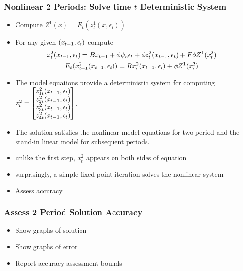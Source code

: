 \documentclass[letter]{beamer}
\begin{document}
\begin{frame}
  \frametitle{Nonlinear 2 Periods: Solve time $t$ Deterministic
    System }
{\small
  \begin{itemize}
  \item Compute $Z^1(x)= E_t(z^1_t(x,\epsilon_t))$
  \item For any given $(x_{t-1},\epsilon_t)$ 
compute
{\small
  \begin{gather}
    x_t^2(x_{t-1},\epsilon_t)=B x_{t-1} + \phi \psi_e\epsilon_t + \phi z^2_t(x_{t-1},\epsilon_t) + F \phi Z^1(x^2_t) \label{bothS}\\
    E_t(x^2_{t+1}(x_{t-1},\epsilon_t))=B x^2_{t}(x_{t-1},\epsilon_t)+ \phi Z^1(x^2_t)
  \end{gather}
}
\item The model equations provide a deterministic system  for computing $  z^2_t=\begin{bmatrix}
    z^2_{1t}(x_{t-1},\epsilon_t)\\
    z^2_{2t}(x_{t-1},\epsilon_t)\\
    z^2_{3t}(x_{t-1},\epsilon_t)\\
    z^2_{4t}(x_{t-1},\epsilon_t)
  \end{bmatrix}$.
\item The solution satisfies the nonlinear model equations for two 
period and the stand-in linear model for subsequent periods.
\item unlike the first step, $x^2_t$ appears on both sides of equation 
\item  surprisingly, a simple fixed point iteration solves the nonlinear system
\item Assess accuracy
  \end{itemize}
}
\end{frame}

\begin{frame}
  \frametitle{Assess 2 Period Solution Accuracy}
  \begin{itemize}
  \item Show graphs of solution
  \item Show graphs of error
  \item Report accuracy assessment bounds
  \end{itemize}
\end{frame}
\end{document}
